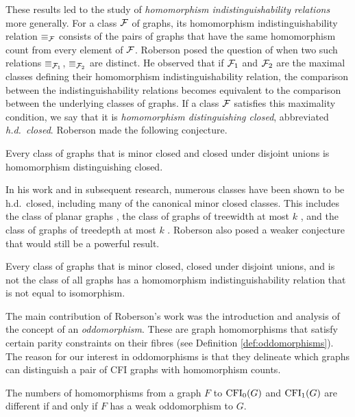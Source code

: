 \documentclass[11pt]{article}
\begin{document}
\par 
These results led to the study of \emph{homomorphism indistinguishability relations} more generally. For a class $\mathcal{F}$ of graphs, its homomorphism indistinguishability relation $\equiv_{\mathcal{F}}$ consists of the pairs of graphs that have the same homomorphism count from every element of $\mathcal{F}$. Roberson \cite{roberson2022oddomorphisms} posed the question of when two such relations $\equiv_{\mathcal{F}_1}$, $\equiv_{\mathcal{F}_2}$ are distinct. He observed that if $\mathcal{F}_1$ and $\mathcal{F}_2$ are the maximal classes defining their homomorphism indistinguishability relation, the comparison between the indistinguishability relations becomes equivalent to the comparison between the underlying classes of graphs. If a class $\mathcal{F}$ satisfies this maximality condition, we say that it is \emph{homomorphism distinguishing closed}, abbreviated \emph{h.d.\ closed}.
Roberson made the following conjecture.
\begin{conjecture}
    Every class of graphs that is minor closed and closed under disjoint unions is homomorphism distinguishing closed.
\end{conjecture}
In his work and in subsequent research, numerous classes have been shown to be h.d.\ closed, including many of the canonical minor closed classes. This includes the class of planar graphs \cite{roberson2022oddomorphisms}, the class of graphs of treewidth at most $k$ \cite{neuen2023homomorphism}, and the class of graphs of treedepth at most $k$ \cite{fluck2023goingdeepgoingwide}.
Roberson also posed a weaker conjecture that would still be a powerful result.
\begin{conjecture}
    Every class of graphs that is minor closed, closed under disjoint unions, and is not the class of all graphs has a homomorphism indistinguishability relation that is not equal to isomorphism.
\end{conjecture}
\par 
The main contribution of Roberson's work \cite{roberson2022oddomorphisms} was the introduction and analysis of the concept of an \emph{oddomorphism}. These are graph homomorphisms that satisfy certain parity constraints on their fibres (see Definition \ref{def:oddomorphisms}). The reason for our interest in oddomorphisms is that they delineate which graphs can distinguish a pair of CFI graphs with homomorphism counts.
\begin{theorem}
    The numbers of homomorphisms from a graph $F$ to $\operatorname{CFI}_0(G)$ and $\operatorname{CFI}_1(G)$ are different if and only if $F$ has a weak oddomorphism to $G$.
\end{theorem}
\end{document}
